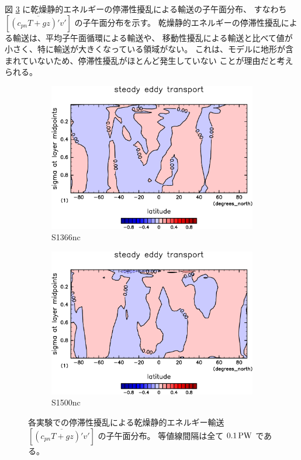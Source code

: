 \documentclass[body]{subfiles}
\begin{document}
図 \ref{乾燥静的エネルギー停滞性擾乱nc} に乾燥静的エネルギーの停滞性擾乱による輸送の子午面分布、
すなわち \([\overline{(c_{pn}T+gz)'v'}]\) の子午面分布を示す。
乾燥静的エネルギーの停滞性擾乱による輸送は、平均子午面循環による輸送や、
移動性擾乱による輸送と比べて値が小さく、特に輸送が大きくなっている領域がない。
これは、モデルに地形が含まれていないため、停滞性擾乱がほとんど発生していない
ことが理由だと考えられる。

\afterpage{\clearpage}

\begin{figure}[t]
	\centering
	\begin{subfigure}{.4\textwidth}
		\centering
		\includegraphics[width=\textwidth]{S1366-nc/MeriHeatTransTest@dryStatEn_SE,time=3650:4015-crop-rotate.pdf}
		\caption{S1366nc}\label{乾燥静的エネルギー停滞性擾乱S1366nc}
	\end{subfigure}
	\begin{subfigure}{.4\textwidth}
		\centering
		\includegraphics[width=\textwidth]{S1500-nc/MeriHeatTransTest@dryStatEn_SE,time=3650:4015-crop-rotate.pdf}
		\caption{S1500nc}\label{乾燥静的エネルギー停滞性擾乱S1500nc}
	\end{subfigure}
	\caption[各実験でのに停滞性擾乱依る乾燥静的エネルギー輸送の子午面分布]{
		各実験での停滞性擾乱による乾燥静的エネルギー輸送 \([\overline{(c_{pn}T+gz)'v'}]\) の子午面分布。
		等値線間隔は全て \(0.1\hmu{PW}\) である。
	}\label{乾燥静的エネルギー停滞性擾乱nc}
\end{figure}
\end{document}
